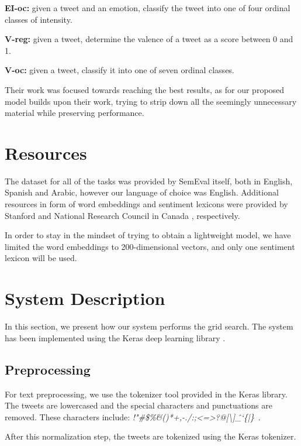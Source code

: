 \documentclass[10pt, a4paper]{article}
\begin{document}
\textbf{EI-oc:} given a tweet and an emotion, classify the tweet into one of four ordinal classes of intensity.

\textbf{V-reg:} given a tweet, determine the valence of a tweet as a score between 0 and 1.

\textbf{V-oc:} given a tweet, classify it into one of seven ordinal classes.


Their work was focused towards reaching the best results, as for our proposed model builds upon their work, trying to strip down all the seemingly unnecessary material while preserving performance.

\section{Resources}
The dataset for all of the tasks was provided by SemEval itself, both in English, Spanish and Arabic, however our language of choice was English. Additional resources in form of word embeddings and sentiment lexicons were provided by Stanford \citep{glove} and National Research Council in Canada \citep{nrcic}, respectively. 

In order to stay in the mindset of trying to obtain a lightweight model, we have limited the word embeddings to 200-dimensional vectors, and only one sentiment lexicon will be used.


\section{System Description}
In this section, we present how our system performs the grid search.
The system has been implemented using the Keras deep learning library \citep{chollet2015keras}.

\subsection{Preprocessing}
For text preprocessing, we use the tokenizer tool provided in the Keras library.
The tweets are lowercased and the special characters and
punctuations are removed.
These characters include: \textit{!"#\$\%&()*+,-./:;<=>?@[\textbackslash]\^\_`\{|\}~}.

After this normalization step, the tweets are tokenized using the Keras tokenizer.
\end{document}
